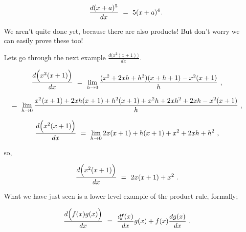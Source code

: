 \documentclass{article}
\begin{document}
\begin{equation} \label{eq:321}
\frac{d (x + a)^5}{dx} \hspace{0.125cm} = \hspace{0.125cm} 5(x + a)^4 . \hspace{0.125cm}
\end{equation}

We aren't quite done yet, because there are also products! But don't worry we can easily prove these too!

Lets go through the next example   \begin{math} \frac{d \Big( x^2(x + 1)\Big)}{dx} \end{math}.

\begin{equation} \label{eq:322}
\frac{d \Big( x^2(x + 1)\Big)}{dx} \hspace{0.125cm} = \hspace{0.125cm} \lim_{h\to0} \frac{(x^2 + 2xh + h^2)(x + h + 1) - x^2(x + 1)}{h} \hspace{0.125cm} ,
\end{equation}

\begin{equation} \label{eq:323}
= \hspace{0.125cm} \lim_{h\to0} \frac{x^2(x + 1) + 2xh(x + 1) + h^2(x + 1) + x^2 h + 2x h^2 + 2xh - x^2(x + 1)}{h} \hspace{0.125cm} ,
\end{equation}

\begin{equation} \label{eq:324}
\frac{d \Big( x^2(x + 1) \Big)}{dx} \hspace{0.125cm} = \hspace{0.125cm} \lim_{h\to0} 2x(x + 1) + h(x + 1) + x^2 + 2x h + h^2 \hspace{0.125cm} , 
\end{equation}

so,

\begin{equation} \label{eq:325}
\frac{d \Big( x^2(x + 1)\Big)}{dx} \hspace{0.125cm} = \hspace{0.125cm} 2x(x + 1) + x^2 \hspace{0.125cm} .
\end{equation}

What we have just seen is a lower level example of the product rule, formally;

\begin{equation} \label{eq:326}
\frac{d \Big( f(x) g(x) \Big)}{dx} \hspace{0.125cm} = \hspace{0.125cm} \frac{d f(x)}{dx}g(x) + f(x)\frac{d g(x)}{dx} \hspace{0.125cm} .
\end{equation}
\end{document}

